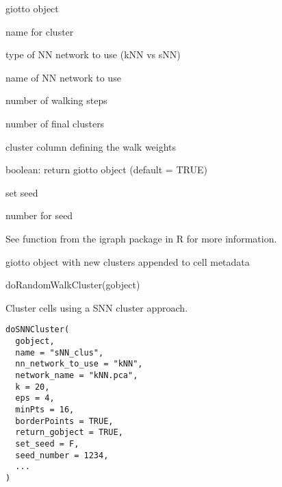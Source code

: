 \documentclass[a4paper]{book}
\begin{document}
\begin{Arguments}
\begin{ldescription}
\item[\code{gobject}] giotto object

\item[\code{name}] name for cluster

\item[\code{nn\_network\_to\_use}] type of NN network to use (kNN vs sNN)

\item[\code{network\_name}] name of NN network to use

\item[\code{walk\_steps}] number of walking steps

\item[\code{walk\_clusters}] number of final clusters

\item[\code{walk\_weights}] cluster column defining the walk weights

\item[\code{return\_gobject}] boolean: return giotto object (default = TRUE)

\item[\code{set\_seed}] set seed

\item[\code{seed\_number}] number for seed
\end{ldescription}
\end{Arguments}
%
\begin{Details}\relax
See  function from the igraph
package in R for more information.
\end{Details}
%
\begin{Value}
giotto object with new clusters appended to cell metadata
\end{Value}
%
\begin{Examples}
\begin{ExampleCode}
    doRandomWalkCluster(gobject)
\end{ExampleCode}
\end{Examples}
%
\begin{Description}\relax
Cluster cells using a SNN cluster approach.
\end{Description}
%
\begin{Usage}
\begin{verbatim}
doSNNCluster(
  gobject,
  name = "sNN_clus",
  nn_network_to_use = "kNN",
  network_name = "kNN.pca",
  k = 20,
  eps = 4,
  minPts = 16,
  borderPoints = TRUE,
  return_gobject = TRUE,
  set_seed = F,
  seed_number = 1234,
  ...
)
\end{verbatim}
\end{Usage}
\end{document}
